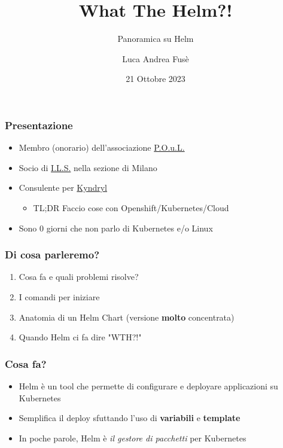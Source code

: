 \documentclass{beamer}
\title{What The Helm?!}
\subtitle{Panoramica su Helm}
\author{Luca Andrea Fusè}
\date{21 Ottobre 2023}
\begin{document}
\renewcommand{\CancelColor}{\color{red}}

\begin{frame}
    \titlepage
\end{frame}
 
 \begin{frame}
     \frametitle{Presentazione}

    \begin{itemize}
        \item Membro (onorario) dell'associazione \href{https://www.poul.org}{P.O.u.L.}
        \item Socio di \href{https://www.ils.org}{I.L.S.} nella sezione di Milano
        \item Consulente per \href{https://www.kyndryl.com}{Kyndryl}
        \begin{itemize}\item TL;DR Faccio cose con Openshift/Kubernetes/Cloud \end{itemize}
        \item Sono 0 giorni che non parlo di Kubernetes e/o Linux
    \end{itemize}
 \end{frame}
 
 \begin{frame}
   \frametitle{Di cosa parleremo?}
   \begin{enumerate}
    \item Cosa fa e quali problemi risolve?
    \item I comandi per iniziare
    \item Anatomia di un Helm Chart (versione \textbf{molto} concentrata)
    \item Quando Helm ci fa dire "WTH?!"
   
   \end{enumerate}
  \end{frame}

\begin{frame}
\frametitle{Cosa fa?}
 \begin{itemize}
    \item Helm è un tool che permette di configurare e deployare applicazioni su Kubernetes
    \item Semplifica il deploy sfuttando l'uso di \textbf{variabili} e \textbf{template}
    \item In poche parole, Helm è \textit{il gestore di pacchetti} per Kubernetes
  \end{itemize}
\end{frame}
\end{document}
